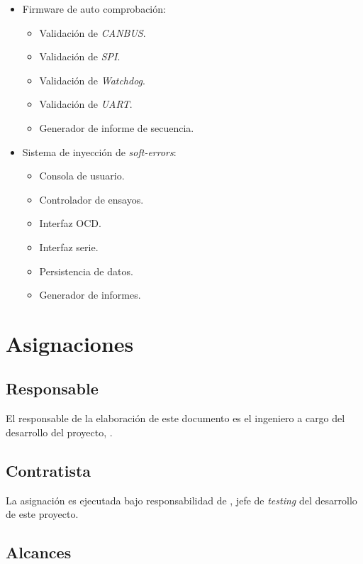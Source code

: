 \documentclass[
    11pt,
    spanish,
	a4paper
]{article}
\begin{document}
\begin{itemize}
	\item Firmware de auto comprobación:
		\begin{itemize}
			\item Validación de \emph{CANBUS}.
			\item Validación de \emph{SPI}.
			\item Validación de \emph{Watchdog}.
			\item Validación de \emph{UART}.
			\item Generador de informe de secuencia.
		\end{itemize}
	\item Sistema de inyección de \emph{soft-errors}:
		\begin{itemize}
			\item Consola de usuario.
			\item Controlador de ensayos.
			\item Interfaz OCD.
			\item Interfaz serie.
			\item Persistencia de datos.
			\item Generador de informes.
		\end{itemize}
\end{itemize}


\section{Asignaciones}
\label{sec:asignaciones}


\subsection{Responsable}
\label{sub:responsable}

El responsable de la elaboración de este documento es el ingeniero a cargo del desarrollo del proyecto, \MyAuthor.

\subsection{Contratista}
\label{sub:contratista}

La asignación es ejecutada bajo responsabilidad de \MyAuthor, jefe de \emph{testing} del desarrollo de este proyecto.

\subsection{Alcances}
\label{sub:alcances}
\end{document}
